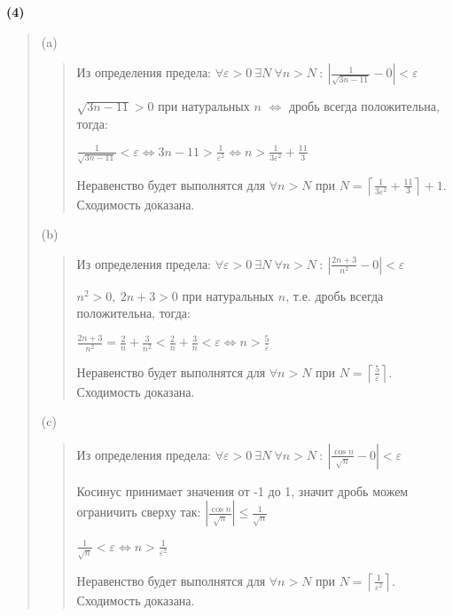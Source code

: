 \documentclass{article}
\begin{document}
\textsf{\textbf{(4)}}
\begin{quote}
(a) 
\begin{quote}
   Из определения предела:
   $\forall \varepsilon > 0 \ \exists N \ \forall n > N \ : \ |\frac{1}{\sqrt{3n - 11}} - 0| < \varepsilon$
   
    $\sqrt{3n - 11} > 0$ при натуральных $n$ $\Leftrightarrow $ дробь всегда положительна, тогда:
    
    $\frac{1}{\sqrt{3n - 11}} < \varepsilon \Longleftrightarrow
    3n - 11 > \frac{1}{\varepsilon ^ 2} \Longleftrightarrow n > \frac{1}{3 \varepsilon ^ 2} + \frac{11}{3}$

    Неравенство будет выполнятся для $\forall n > N$ при $N = \left\lceil{\frac{1}{3 \varepsilon ^ 2} + \frac{11}{3}}\right\rceil + 1$. Сходимость доказана.
\end{quote}

(b) 
\begin{quote}
   Из определения предела:
   $\forall \varepsilon > 0 \ \exists N \ \forall n > N \ : \ |\frac{2n + 3}{n ^ 2} - 0| < \varepsilon$
   
    $n^2 > 0, \ 2n + 3 > 0$ при натуральных $n$, т.е. дробь всегда положительна, тогда:

    $\frac{2n + 3}{n^2} = \frac{2}{n} + \frac{3}{n ^ 2} < \frac{2}{n} + \frac{3}{n} < \varepsilon \Longleftrightarrow n > \frac{5}{\varepsilon}$

    
    Неравенство будет выполнятся для $\forall n > N$ при $N = \left\lceil{\frac{5}{\varepsilon}}\right\rceil$. Сходимость доказана.
\end{quote}

(c) 
\begin{quote}
   Из определения предела:
   $\forall \varepsilon > 0 \ \exists N \ \forall n > N \ : \ |\frac{\cos n}{\sqrt{n}} - 0| < \varepsilon$

   
   Косинус принимает значения от -1 до 1, значит дробь можем ограничить сверху так:
   $
    |\frac{\cos n}{\sqrt{n}}| \leq \frac{1}{\sqrt{n}}
   $

  $\frac{1}{\sqrt{n}} < \varepsilon \Longleftrightarrow n > \frac{1}{\varepsilon ^ 2}$ 
  
    Неравенство будет выполнятся для $\forall n > N$ при $N = \left\lceil{\frac{1}{\varepsilon ^ 2}}\right\rceil$. Сходимость доказана.
\end{quote}
\end{quote}
\end{document}

